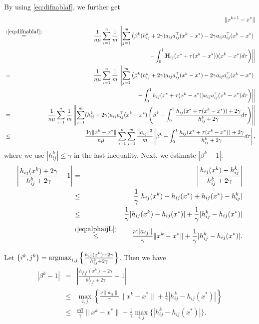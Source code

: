 \documentclass[12pt]{article}
\newcommand{\newalpha}{h}
\newcommand{\mH}{\mathbf{H}}
\begin{document}
By using 	\eqref{eq:difnablaf}, we further get
\begin{eqnarray*}
	&&\|x^{k+1} - x^*\|\\
	&\overset{(\ref{eq:difnablaf})}{=}& \frac{1}{n \mu} \sum_{i=1}^n \frac{1}{m} \left\|  \sum_{j=1}^{m} \left( \beta^k (h_{ij}^k + 2\gamma)a_{ij}a_{ij}^\top (x^k - x^*) - 2\gamma a_{ij}a_{ij}^\top (x^k - x^*) \right. \right. \\ 
	&& \left. \left. -  \int_{0}^1 \mH_{ij} (x^* + \tau(x^k - x^*)) (x^k - x^*)d\tau  \right)   \right\| \\ 
	&=& \frac{1}{n \mu} \sum_{i=1}^n \frac{1}{m} \left\|  \sum_{j=1}^{m} \left( \beta^k (h_{ij}^k + 2\gamma)a_{ij}a_{ij}^\top (x^k - x^*) - 2\gamma a_{ij}a_{ij}^\top (x^k - x^*) \right. \right. \\ 
	&& \left. \left. -  \int_{0}^1 \newalpha_{ij} (x^* + \tau(x^k - x^*))a_{ij}a_{ij}^\top (x^k - x^*)d\tau  \right)   \right\| \\ 
	&=& \frac{1}{n \mu} \sum_{i=1}^n \frac{1}{m} \left\|  \sum_{j=1}^{m}  (h_{ij}^k + 2\gamma)a_{ij}a_{ij}^\top (x^k - x^*) \left( \beta^k - \int_{0}^1 \frac{\newalpha_{ij}(x^* + \tau(x^k - x^*)) + 2\gamma}{ h_{ij}^k + 2\gamma} d\tau \right) \right\| \\ 
	&\leq& \frac{3\gamma\|x^k - x^*\|}{n \mu} \sum_{i=1}^n \sum_{j=1}^{m} \frac{\|a_{ij}\|^2}{m} \left|   \beta^k - \int_{0}^1 \frac{\newalpha_{ij}(x^* + \tau(x^k - x^*)) + 2\gamma}{ h_{ij}^k + 2\gamma} d\tau   \right|, 
\end{eqnarray*}
where we use $|h_{ij}^k| \leq \gamma$ in the last inequality. Next, we estimate $|\beta^k - 1|$:
\begin{eqnarray*}
	\left|  \frac{\newalpha_{ij}(x^k) + 2\gamma}{h_{ij}^k + 2\gamma}  - 1  \right| &=& \left|  \frac{\newalpha_{ij}(x^k) - h_{ij}^k}{h_{ij}^k + 2\gamma}  \right| \\ 
	&\leq& \frac{1}{\gamma} |\newalpha_{ij}(x^k) - \newalpha_{ij}(x^*) + \newalpha_{ij}(x^*) - h_{ij}^k| \\ 
	&\leq& \frac{1}{\gamma} |\newalpha_{ij}(x^k) - \newalpha_{ij}(x^*)| + \frac{1}{\gamma} |h_{ij}^k - \newalpha_{ij}(x^*)| \\ 
	&\overset{(\ref{eq:alphaijL})}{\leq}& \frac{\nu \|a_{ij}\|}{\gamma} \|x^k - x^*\| + \frac{1}{\gamma} |h_{ij}^k - \newalpha_{ij}(x^*)|. 
\end{eqnarray*}



\noindent Let $\{i^k, j^k\} = {\rm argmax}_{i, j} \left\{ \frac{\newalpha_{ij}(x^k) + 2\gamma}{h_{ij}^k + 2\gamma}  \right\}$. Then we have 
\begin{eqnarray*}
	|\beta^k - 1| &=& \left| \frac{\newalpha_{i^kj^k}(x^k) + 2\gamma}{h_{i^kj^k}^k + 2\gamma}   - 1  \right| \\ 
	&\leq& \max_{i, j} \left\{  \frac{\nu \|a_{ij}\|}{\gamma} \|x^k - x^*\| + \frac{1}{\gamma} |h_{ij}^k - \newalpha_{ij}(x^*)|  \right\} \\ 
	&\leq& \frac{\nu R}{\gamma} \|x^k - x^*\| + \frac{1}{\gamma} \max_{i, j} \{|h_{ij}^k - \newalpha_{ij}(x^*)| \}.  
\end{eqnarray*}
\end{document}
